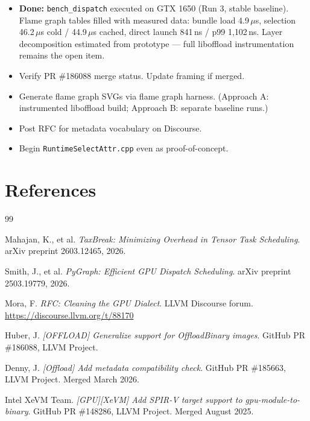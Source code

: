 \documentclass[11pt]{article}
\begin{document}
\begin{itemize}
  \item \textbf{Done:} \texttt{bench\_dispatch} executed on GTX 1650 (Run 3, stable baseline). Flame graph tables filled with measured data: bundle load 4.9\,\(\mu\)s, selection 46.2\,\(\mu\)s cold / 44.9\,\(\mu\)s cached, direct launch 841\,ns / p99 1{,}102\,ns. Layer decomposition estimated from prototype --- full liboffload instrumentation remains the open item.
  \item Verify PR \#186088 merge status. Update framing if merged.
  \item Generate flame graph SVGs via flame graph harness. (Approach A: instrumented liboffload build; Approach B: separate baseline runs.)
  \item Post RFC for metadata vocabulary on Discourse.
  \item Begin \texttt{RuntimeSelectAttr.cpp} even as proof-of-concept.
\end{itemize}

\section*{References}


\begin{thebibliography}{99}

Mahajan, K., et al.
\emph{TaxBreak: Minimizing Overhead in Tensor Task Scheduling}.
arXiv preprint 2603.12465, 2026.

Smith, J., et al.
\emph{PyGraph: Efficient GPU Dispatch Scheduling}.
arXiv preprint 2503.19779, 2026.

Mora, F.
\emph{RFC: Cleaning the GPU Dialect}.
LLVM Discourse forum.
\url{https://discourse.llvm.org/t/88170}

Huber, J.
\emph{[OFFLOAD] Generalize support for OffloadBinary images}.
GitHub PR \#186088, LLVM Project.

Denny, J.
\emph{[Offload] Add metadata compatibility check}.
GitHub PR \#185663, LLVM Project. Merged March 2026.

Intel XeVM Team.
\emph{[GPU][XeVM] Add SPIR-V target support to gpu-module-to-binary}.
GitHub PR \#148286, LLVM Project. Merged August 2025.

\end{thebibliography}
\end{document}
